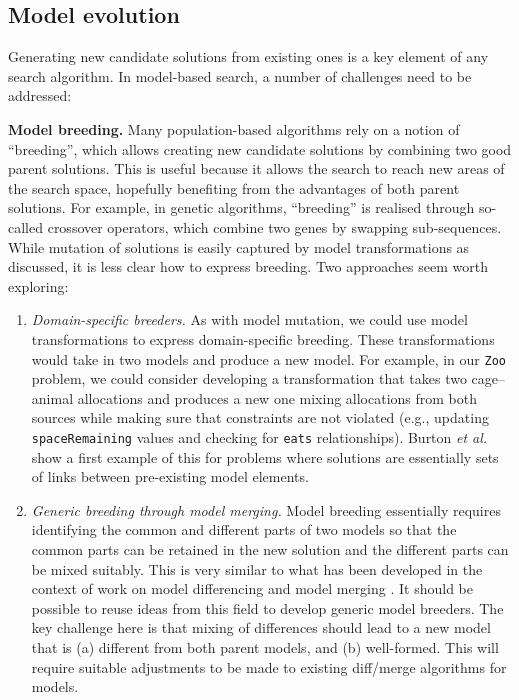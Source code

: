 	\subsection{Model evolution}
	
		Generating new candidate solutions from existing ones is a key element of any search algorithm. In model-based search, a number of challenges need to be
		addressed:
		
		\textbf{Model breeding.}
		  Many population-based algorithms rely on a notion of ``breeding'', which allows creating new candidate solutions by combining two good parent solutions. This
			is useful because it allows the search to reach new areas of the search space, hopefully benefiting from the advantages of both parent solutions. For
			example, in genetic algorithms, ``breeding'' is realised through so-called crossover operators, which combine two genes by swapping sub-sequences. While
			mutation of solutions is easily captured by model transformations as discussed, it is less clear how to express breeding. Two approaches seem worth exploring:
			
			\begin{enumerate}
			  \item \emph{Domain-specific breeders.} As with model mutation, we could use model transformations to express domain-specific breeding. These
				      transformations would take in two models and produce a new model. For example, in our \texttt{Zoo} problem, we could consider developing a
							transformation that takes two cage--animal allocations and produces a new one mixing allocations from both sources while making sure that constraints
							are not violated (e.g., updating \texttt{spaceRemaining} values and checking for \texttt{eats} relationships). Burton \emph{et al.} \cite{Burton+12}
							show a first example of this for problems where solutions are essentially sets of links between pre-existing model elements.
				\item \emph{Generic breeding through model merging.} Model breeding essentially requires identifying the common and different parts of two models so that
				      the common parts can be retained in the new solution and the different parts can be mixed suitably. This is very similar to what has been developed
							in the context of work on model differencing and model merging \cite{Kolovos09,Kolovos+09b,Maoz+10,Langer+14}. It should be possible to reuse ideas
							from this field to develop generic model breeders. The key challenge here is that mixing of differences should lead to a new model that is (a)
							different from both parent models, and (b) well-formed. This will require suitable adjustments to be made to existing diff/merge algorithms for
							models.
			\end{enumerate}
			
